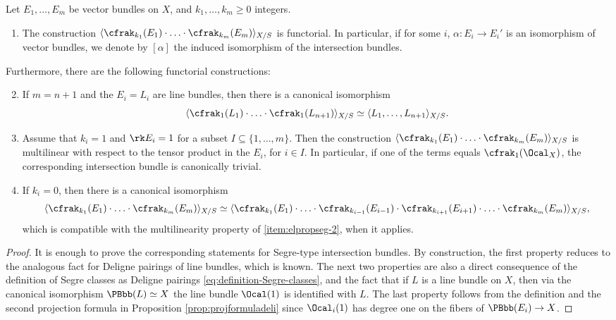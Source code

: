 \begin{lemma}\label{lemma:elementary-properties-segre}
Let $E_{1},\ldots, E_{m}$ be vector bundles on $X$, and $k_{1},\ldots, k_{m}\geq 0$ integers.
\begin{enumerate}
\item\label{item:elpropsef-0} The construction $\langle \cfrak_{k_{1}}(E_{1})\cdot\ldots \cdot \cfrak_{k_{m}}(E_{m})\rangle_{X/S}$ is functorial. In particular, if for some $i$, $\alpha: E_i \to E_i'$ is an isomorphism of vector bundles, we denote by $[\alpha]$ the induced isomorphism of the intersection bundles.
\end{enumerate}
Furthermore, there are the following functorial constructions:
\begin{enumerate}
\setcounter{enumi}{1}
\item\label{item:elpropseg-1} If $m=n+1$ and the $E_{i}=L_{i}$ are line bundles, then there is a canonical isomorphism
\begin{displaymath}
\langle \cfrak_{1}(L_1)\cdot \ldots\cdot \cfrak_{1}(L_{n+1}) \rangle_{X/S}\simeq
\langle L_{1},\ldots, L_{n+1}\rangle_{X/S}.
\end{displaymath}
\item\label{item:elpropseg-2} Assume that $k_{i}=1$ and $\rk E_{i}=1$ for a subset $I\subseteq\lbrace 1,\ldots, m\rbrace$. Then the construction $\langle \cfrak_{k_1}(E_1)\cdot \ldots\cdot \cfrak_{k_{m}}(E_m) \rangle_{X/S}$ is multilinear with respect to the tensor product in the $E_{i}$, for $i\in I$. In particular, if one of the terms equals $\cfrak_1(\Ocal_X)$, the corresponding intersection bundle is canonically trivial.
\item\label{item:elpropseg-3} If $k_{i}=0$, then there is a canonical isomorphism
\begin{displaymath}
\langle \cfrak_{k_1}(E_1)\cdot \ldots\cdot \cfrak_{k_m}(E_m) \rangle_{X/S}\simeq
\langle\cfrak_{k_{1}}(E_{1})\cdot\ldots \cdot\cfrak_{k_{i-1}}(E_{i-1})\cdot\cfrak_{k_{i+1}}(E_{i+1})\cdot\ldots\cdot\cfrak_{k_{m}}(E_m)\rangle_{X/S},
\end{displaymath}
which is compatible with the multilinearity property of \eqref{item:elpropseg-2}, when it applies.
\end{enumerate}
\end{lemma}
\begin{proof}
It is enough to prove the corresponding statements for Segre-type intersection bundles. By construction, the first property reduces to the analogous fact for Deligne pairings of line bundles, which is known. The next two properties are also a direct consequence of the definition of Segre classes as Deligne pairings \eqref{eq:definition-Segre-classes}, and the fact that if $L$ is a line bundle on $X$, then via the canonical isomorphism $\PBbb(L)\simeq X$ the line bundle $\Ocal(1)$ is identified with $L$. The last property follows from the definition and the second projection formula in Proposition \ref{prop:projformuladeli} since $\Ocal_{i}(1)$ has degree one on the fibers of $\PBbb(E_{i})\to X$.
\end{proof}

